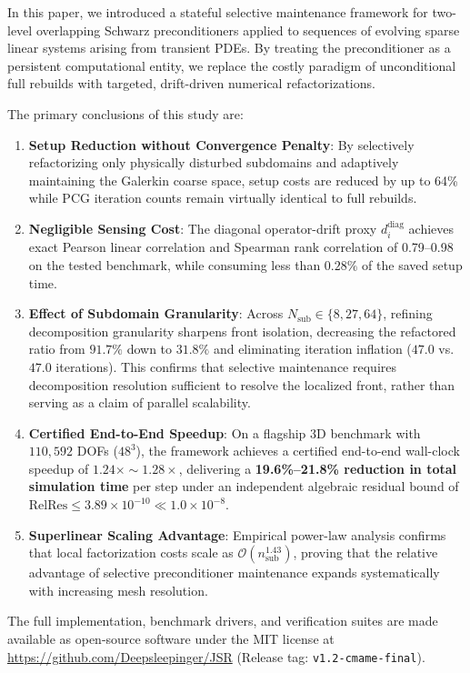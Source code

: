 \documentclass[preprint,12pt,3p]{elsarticle}
\begin{document}
In this paper, we introduced a stateful selective maintenance framework for two-level overlapping Schwarz preconditioners applied to sequences of evolving sparse linear systems arising from transient PDEs. By treating the preconditioner as a persistent computational entity, we replace the costly paradigm of unconditional full rebuilds with targeted, drift-driven numerical refactorizations.

The primary conclusions of this study are:
\begin{enumerate}
    \item \textbf{Setup Reduction without Convergence Penalty}: By selectively refactorizing only physically disturbed subdomains and adaptively maintaining the Galerkin coarse space, setup costs are reduced by up to 64\% while PCG iteration counts remain virtually identical to full rebuilds.
    \item \textbf{Negligible Sensing Cost}: The diagonal operator-drift proxy $d_i^{\text{diag}}$ achieves exact Pearson linear correlation and Spearman rank correlation of 0.79--0.98 on the tested benchmark, while consuming less than $0.28\%$ of the saved setup time.
    \item \textbf{Effect of Subdomain Granularity}: Across $N_{\text{sub}} \in \{8, 27, 64\}$, refining decomposition granularity sharpens front isolation, decreasing the refactored ratio from $91.7\%$ down to $31.8\%$ and eliminating iteration inflation ($47.0$ vs. $47.0$ iterations). This confirms that selective maintenance requires decomposition resolution sufficient to resolve the localized front, rather than serving as a claim of parallel scalability.
    \item \textbf{Certified End-to-End Speedup}: On a flagship 3D benchmark with $110,592$ DOFs ($48^3$), the framework achieves a certified end-to-end wall-clock speedup of $1.24\times \sim 1.28\times$, delivering a \textbf{19.6\%--21.8\% reduction in total simulation time} per step under an independent algebraic residual bound of $\text{RelRes} \le 3.89 \times 10^{-10} \ll 1.0 \times 10^{-8}$.
    \item \textbf{Superlinear Scaling Advantage}: Empirical power-law analysis confirms that local factorization costs scale as $\mathcal{O}(n_{\text{sub}}^{1.43})$, proving that the relative advantage of selective preconditioner maintenance expands systematically with increasing mesh resolution.
\end{enumerate}

The full implementation, benchmark drivers, and verification suites are made available as open-source software under the MIT license at \url{https://github.com/Deepsleepinger/JSR} (Release tag: \texttt{v1.2-cmame-final}).
\end{document}

